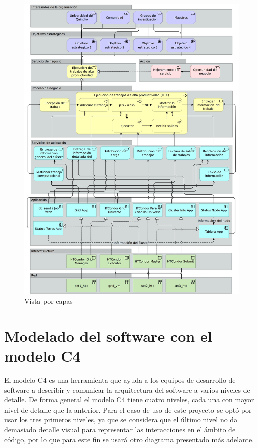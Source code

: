 \begin{figure}[H]
	\centering
	\includegraphics[scale=0.125]{tablas-images/archi/Layered View.jpg}
	\caption{Vista por capas}
    \label{fig:archiLayeredView}
\end{figure}

\section{Modelado del software con el modelo C4}
El modelo C4 es una herramienta que ayuda a los equipos de desarrollo de software a describir y comunicar la arquitectura del software a varios niveles de detalle. De forma general el modelo C4 tiene cuatro niveles, cada una con mayor nivel de detalle que la anterior. Para el caso de uso de este proyecto se optó por usar los tres primeros niveles, ya que se considera que el último nivel no da demasiado detalle visual para representar las interacciones en el ámbito de código, por lo que para este fin se usará otro diagrama presentado más adelante.

